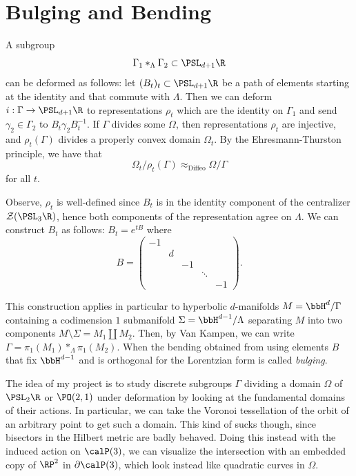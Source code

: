 \documentclass{article}
\begin{document}
\section{Bulging and Bending}

A subgroup \[\Gamma_1 *_\Lambda \Gamma_2 \subset \PSL_{d + 1}\R\] can be deformed as follows: let $(B_t)_t \subset \PSL_{d + 1}\R$ be a path of elements starting at the identity and that commute with $\Lambda$. Then we can deform $i: \Gamma \to \PSL_{d + 1}\R$ to representations $\rho_t$ which are the identity on $\Gamma_1$ and send $\gamma_2 \in \Gamma_2$ to $B_t\gamma_2B_t^{-1}$. If $\Gamma$ divides some $\Omega$, then representations $\rho_t$ are injective, and $\rho_t(\Gamma)$ divides a properly convex domain $\Omega_t$. By the Ehresmann-Thurston principle, we have that \[\Omega_t/\rho_t(\Gamma) \approx_{\text{Diffeo}} \Omega/\Gamma\] for all $t$.

Observe, $\rho_t$ is well-defined since $B_t$ is in the identity component of the centralizer $\mathcal{Z}(\PSL_3\R)$, hence both components of the representation agree on $\Lambda$. We can construct $B_t$ as follows: $B_t = e^{tB}$ where \[B = \begin{pmatrix} -1 \\ &d \\ &&-1 \\ &&&\ddots \\ &&&&-1 \end{pmatrix}. \]  

This construction applies in particular to hyperbolic $d$-manifolds $M = \bbH^d/\Gamma$ containing a codimension $1$ submanifold $\Sigma = \bbH^{d - 1}/\Lambda$ separating $M$ into two components $M\setminus\Sigma = M_1 \amalg M_2$. Then, by Van Kampen, we can write $\Gamma = \pi_1(M_1) *_{\Lambda} \pi_1(M_2)$. When the bending obtained from using elements $B$ that fix $\bbH^{d - 1}$ and is orthogonal for the Lorentzian form is called \textit{bulging}.

The idea of my project is to study discrete subgroups $\Gamma$ dividing a domain $\Omega$ of $\PSL_2\R$ or $\PO(2,1)$ under deformation by looking at the fundamental domains of their actions. In particular, we can take the Voronoi tessellation of the orbit of an arbitrary point to get such a domain. This kind of sucks though, since bisectors in the Hilbert metric are badly behaved. Doing this instead with the induced action on $\calP(3)$, we can visualize the intersection with an embedded copy of $\RP^2$ in $\partial\calP(3)$, which look instead like quadratic curves in $\Omega$.
\end{document}
